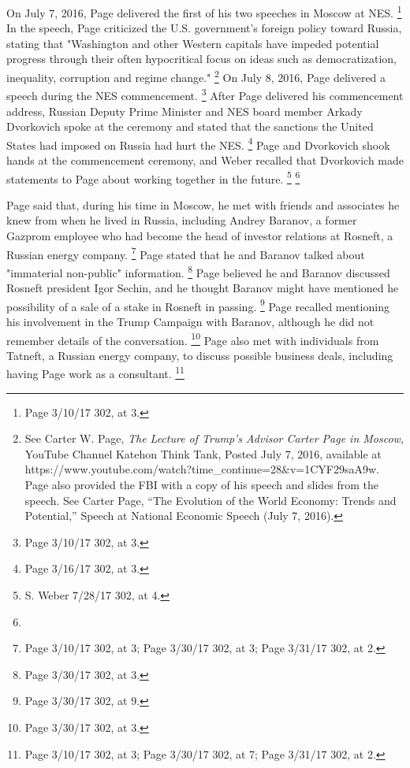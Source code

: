 On July 7, 2016, Page delivered the first of his two speeches in Moscow at NES. %
\footnote{Page 3/10/17 302, at 3.}
In the speech, Page criticized the U.S. government's foreign policy toward Russia, stating that "Washington and other Western capitals have impeded potential progress through their often hypocritical focus on ideas such as democratization, inequality, corruption and regime change."%
\footnote{See Carter W. Page, \textit{The Lecture of Trump’s Advisor Carter Page in Moscow}, YouTube Channel Katehon Think Tank, Posted July 7, 2016, 
available at https://www.youtube.com/watch?time\_continue=28\&v=1CYF29saA9w. 
Page also provided the FBI with a copy of his speech and slides from the speech. 
See Carter Page, “The Evolution of the World Economy: Trends and Potential,” Speech at National Economic Speech (July 7, 2016).}
On July 8, 2016, Page delivered a speech during the NES commencement.%
\footnote{Page 3/10/17 302, at 3.}
After Page delivered his commencement address, Russian Deputy Prime Minister and NES board member Arkady Dvorkovich spoke at the ceremony and stated that the sanctions the United States had imposed on Russia had hurt the NES.%
\footnote{Page 3/16/17 302, at 3.}
Page and Dvorkovich shook hands at the commencement ceremony, and Weber recalled that Dvorkovich made statements to Page about working together in the future.%
\footnote{S. Weber 7/28/17 302, at 4.}
\footnote{}

Page said that, during his time in Moscow, he met with friends and associates he knew from when he lived in Russia, including Andrey Baranov, a former Gazprom employee who had become the head of investor relations at Rosneft, a Russian energy company.%
\footnote{Page 3/10/17 302, at 3; 
Page 3/30/17 302, at 3; 
Page 3/31/17 302, at 2.}
Page stated that he and Baranov talked about "immaterial non-public" information.%
\footnote{Page 3/30/17 302, at 3.}
Page believed he and Baranov discussed Rosneft president Igor Sechin, and he thought Baranov might have mentioned he possibility of a sale of a stake in Rosneft in passing.%
\footnote{Page 3/30/17 302, at 9. }
Page recalled mentioning his involvement in the Trump Campaign with Baranov, although he did not remember details of the conversation.%
\footnote{ Page 3/30/17 302, at 3.}
Page also met with individuals from Tatneft, a Russian energy company, to discuss possible business deals, including having Page work as a consultant.%
\footnote{Page 3/10/17 302, at 3; 
Page 3/30/17 302, at 7; 
Page 3/31/17 302, at 2.}

